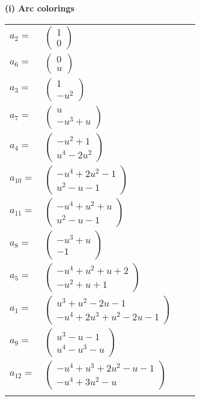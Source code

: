 \documentclass[1p]{elsarticle_modified}
\theoremstyle{definition}
\begin{document}
\flushleft \textbf{(i) Arc colorings}\\
\begin{tabular}{m{7pt} m{180pt} m{7pt} m{180pt} }
\flushright $a_{2}=$&$\begin{pmatrix}1\\0\end{pmatrix}$ \\
\flushright $a_{6}=$&$\begin{pmatrix}0\\u\end{pmatrix}$ \\
\flushright $a_{3}=$&$\begin{pmatrix}1\\- u^2\end{pmatrix}$ \\
\flushright $a_{7}=$&$\begin{pmatrix}u\\- u^3+u\end{pmatrix}$ \\
\flushright $a_{4}=$&$\begin{pmatrix}- u^2+1\\u^4-2 u^2\end{pmatrix}$ \\
\flushright $a_{10}=$&$\begin{pmatrix}- u^4+2 u^2-1\\u^2- u-1\end{pmatrix}$ \\
\flushright $a_{11}=$&$\begin{pmatrix}- u^4+u^2+u\\u^2- u-1\end{pmatrix}$ \\
\flushright $a_{8}=$&$\begin{pmatrix}- u^3+u\\-1\end{pmatrix}$ \\
\flushright $a_{5}=$&$\begin{pmatrix}- u^4+u^2+u+2\\- u^2+u+1\end{pmatrix}$ \\
\flushright $a_{1}=$&$\begin{pmatrix}u^3+u^2-2 u-1\\- u^4+2 u^3+u^2-2 u-1\end{pmatrix}$ \\
\flushright $a_{9}=$&$\begin{pmatrix}u^3- u-1\\u^4- u^3- u\end{pmatrix}$ \\
\flushright $a_{12}=$&$\begin{pmatrix}- u^4+u^3+2 u^2- u-1\\- u^4+3 u^2- u\end{pmatrix}$\\&\end{tabular}
\end{document}
